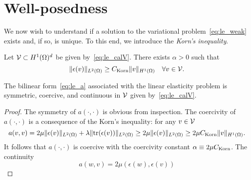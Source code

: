 \section{Well-posedness}
We now wish to understand if a solution to the variational problem~\eqref{eq:le_weak} exists and, if so, is unique.  To this end, we introduce the \emph{Korn's inequality}.
\begin{theorem}
  Let $\mathcal{V} \subset H^1(\Omega)^d$ be given by~\eqref{eq:le_calV}.  There exists $\alpha > 0$ such that
  \begin{equation*}
    \| \epsilon(v) \|_{L^2(\Omega)} \geq C_{\rm Korn} \| v \|_{H^1(\Omega)} \quad \forall v \in \mathcal{V}.
  \end{equation*}
\end{theorem}
\begin{proposition}
  The bilinear form~\eqref{eq:le_a} associated with the linear elasticity problem is symmetric, coercive, and continuous in $\mathcal{V}$ given by~\eqref{eq:le_calV}.
  \begin{proof}
    The symmetry of $a(\cdot,\cdot)$ is obvious from inspection. The coercivity of $a(\cdot,\cdot)$ is a consequence of the Korn's inequality: for any $v \in \mathcal{V}$
    \begin{equation*}
      a(v,v) = 2 \mu \| \epsilon(v) \|_{L^2(\Omega)} + \lambda \| \text{tr}(\epsilon(v)) \|_{L^2(\Omega)}
      \geq 2 \mu \| \epsilon(v) \|_{L^2(\Omega)}
      \geq 2 \mu C_{\rm Korn} \| v \|_{H^1(\Omega)}.
    \end{equation*}
    It follows that $a(\cdot,\cdot)$ is coercive with the coercivity constant $\alpha \equiv 2 \mu C_{\rm Korn}$. The continuity
    \begin{equation*}
      a(w,v) = 2\mu (\epsilon(w), \epsilon(v))
    \end{equation*}
  \end{proof}
\end{proposition}

